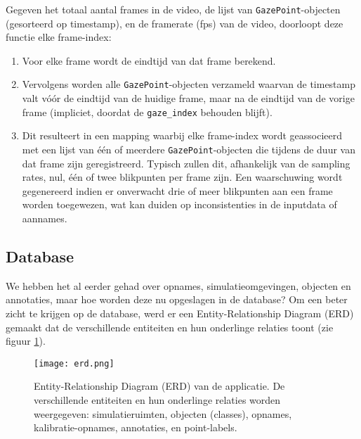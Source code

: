 Gegeven het totaal aantal frames in de video, de lijst van \texttt{GazePoint}-objecten (gesorteerd op timestamp), 
en de framerate (fps) van de video, doorloopt deze functie elke frame-index:
\begin{enumerate}
  \item Voor elke frame wordt de eindtijd van dat frame berekend.
  \item Vervolgens worden alle \texttt{GazePoint}-objecten verzameld waarvan de timestamp valt vóór de eindtijd van de huidige frame, 
  maar na de eindtijd van de vorige frame (impliciet, doordat de \texttt{gaze\_index} behouden blijft).
  \item Dit resulteert in een mapping waarbij elke frame-index wordt geassocieerd met een lijst van één of meerdere 
  \texttt{GazePoint}-objecten die tijdens de duur van dat frame zijn geregistreerd. 
  Typisch zullen dit, afhankelijk van de sampling rates, nul, één of twee blikpunten per frame zijn. 
  Een waarschuwing wordt gegenereerd indien er onverwacht drie of meer blikpunten aan een frame worden toegewezen, 
  wat kan duiden op inconsistenties in de inputdata of aannames.
\end{enumerate}

\subsection{Database}

We hebben het al eerder gehad over opnames, simulatieomgevingen, objecten en annotaties, maar hoe worden deze nu opgeslagen in de database?
Om een beter zicht te krijgen op de database, werd er een Entity-Relationship Diagram (ERD) gemaakt dat de verschillende entiteiten en hun onderlinge relaties toont (zie figuur \ref{fig:erd}).

\begin{figure}[H]
  \centering
  \texttt{[image: erd.png]}
  \caption[]{\label{fig:erd} Entity-Relationship Diagram (ERD) van de applicatie. De verschillende entiteiten en hun onderlinge relaties worden weergegeven: simulatieruimten, objecten (classes), opnames, kalibratie-opnames, annotaties, en point-labels. }
\end{figure}

